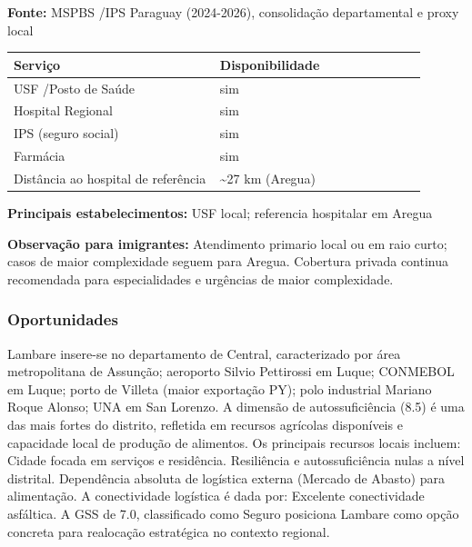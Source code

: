 \textbf{Fonte:} MSPBS /\allowbreak  IPS Paraguay (2024-2026), consolidação
departamental e proxy local

{\def\LTcaptype{none} %
\begin{longtable}{@{}>{\raggedright\arraybackslash}p{0.45\linewidth} >{\raggedright\arraybackslash}p{0.45\linewidth}@{}}
\toprule\noalign{}
Serviço & Disponibilidade \\
\midrule\noalign{}
\endhead
\bottomrule\noalign{}
\endlastfoot
USF /\allowbreak  Posto de Saúde & sim \\
Hospital Regional & sim \\
IPS (seguro social) & sim \\
Farmácia & sim \\
Distância ao hospital de referência & \textasciitilde27 km (Aregua) \\
\end{longtable}
}

\textbf{Principais estabelecimentos:} USF local; referencia hospitalar
em Aregua

\textbf{Observação para imigrantes:} Atendimento primario local ou em
raio curto; casos de maior complexidade seguem para Aregua. Cobertura
privada continua recomendada para especialidades e urgências de maior
complexidade.
\newpage

\subsubsection*{Oportunidades}\label{oport-lambare-1107}
Lambare insere-se no departamento de Central, caracterizado por área metropolitana de Assunção; aeroporto Silvio Pettirossi em Luque; CONMEBOL em Luque; porto de Villeta (maior exportação PY); polo industrial Mariano Roque Alonso; UNA em San Lorenzo. A dimensão de autossuficiência (8.5) é uma das mais fortes do distrito, refletida em recursos agrícolas disponíveis e capacidade local de produção de alimentos. Os principais recursos locais incluem: Cidade focada em serviços e residência. Resiliência e autossuficiência nulas a nível distrital. Dependência absoluta de logística externa (Mercado de Abasto) para alimentação. A conectividade logística é dada por: Excelente conectividade asfáltica. A GSS de 7.0, classificado como Seguro posiciona Lambare como opção concreta para realocação estratégica no contexto regional.

